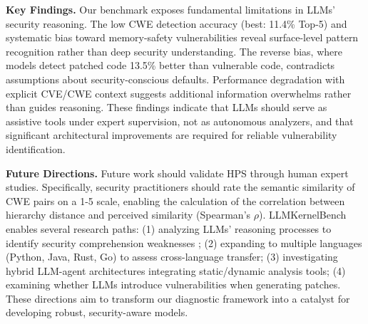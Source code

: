 \documentclass[lettersize,journal]{IEEEtran}
\begin{document}
\textbf{Key Findings.} Our benchmark exposes fundamental limitations in \glspl{LLM}' security reasoning. The low \gls{CWE} detection accuracy (best: 11.4\% Top-5) and systematic bias toward memory-safety vulnerabilities reveal surface-level pattern recognition rather than deep security understanding. The reverse bias, where models detect patched code 13.5\% better than vulnerable code, contradicts assumptions about security-conscious defaults. Performance degradation with explicit CVE/\gls{CWE} context suggests additional information overwhelms rather than guides reasoning. These findings indicate that \glspl{LLM} should serve as assistive tools under expert supervision, not as autonomous analyzers, and that significant architectural improvements are required for reliable vulnerability identification.

\textbf{Future Directions.} Future work should validate \gls{HPS} through human expert studies.
Specifically, security practitioners should rate the semantic similarity of CWE pairs on a 1-5 scale, enabling the calculation of the correlation between hierarchy distance and perceived similarity (Spearman's $\rho$).
LLMKernelBench enables several research paths: (1) analyzing \glspl{LLM}' reasoning processes to identify security comprehension weaknesses \cite{xiang2025towards, zibaeirad2025reasoning}; (2) expanding to multiple languages (Python, Java, Rust, Go) to assess cross-language transfer; (3) investigating hybrid LLM-agent architectures integrating static/dynamic analysis tools; (4) examining whether \glspl{LLM} introduce vulnerabilities when generating patches. These directions aim to transform our diagnostic framework into a catalyst for developing robust, security-aware models.
\begin{table}[!t]
\centering
\caption{Top-8 misclassification patterns showing CWE-119 as a semantic magnet in PBD and CWE-416 confusion dominance in LFD.}
\label{tab:misclassification}
\small
\renewcommand{\arraystretch}{1.1}
\end{table}
\end{document}
